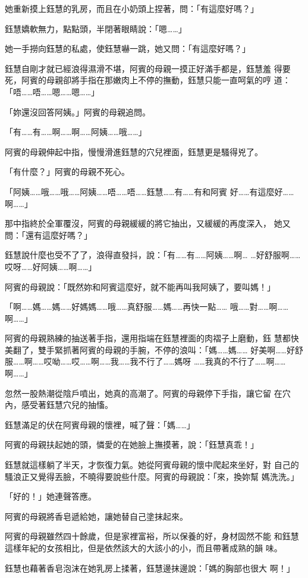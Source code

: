 她重新摸上鈺慧的乳房，而且在小奶頭上捏著，問：「有這麼好嗎？」

鈺慧嬌軟無力，點點頭，半閉著眼睛說：「嗯……」

她一手撈向鈺慧的私處，使鈺慧嚇一跳，她又問：「有這麼好嗎？」

鈺慧自剛才就已經浪得濕滑不堪，阿賓的母親一摸正好滿手都是，鈺慧羞
得要死，阿賓的母親卻將手指在那嫩肉上不停的撫動，鈺慧只能一直呵氣的哼
道：「唔……唔……嗯……嗯……」

「妳還沒回答阿姨。」阿賓的母親追問。

「有……有……啊……啊……阿姨……哦……」

阿賓的母親伸起中指，慢慢滑進鈺慧的穴兒裡面，鈺慧更是騷得兇了。

「有什麼？」阿賓的母親不死心。

「阿姨……哦……哦……阿姨……唔……唔……鈺慧……有……有和阿賓
好……有這麼好……啊……」

那中指終於全軍覆沒，阿賓的母親緩緩的將它抽出，又緩緩的再度深入，
她又問：「還有這麼好嗎？」

鈺慧說什麼也受不了了，浪得直發抖，說：「有……有……阿姨……啊…
…好舒服啊……哎呀……好阿姨……啊……」

阿賓的母親說：「既然妳和阿賓這麼好，就不能再叫我阿姨了，要叫媽！」

「啊……媽……媽……好媽媽……哦……真舒服……媽……再快一點……
哦……對……啊……啊……」

阿賓的母親熟練的抽送著手指，還用指端在鈺慧裡面的肉褶子上磨動，鈺
慧都快美翻了，雙手緊抓著阿賓的母親的手腕，不停的浪叫：「媽……媽……
好美啊……好舒服……啊……哎呦……哎……啊……我……我不行了……媽呀
……我真的不行了……啊……啊……」

忽然一股熱潮從陰戶噴出，她真的高潮了。阿賓的母親停下手指，讓它留
在穴內，感受著鈺慧穴兒的抽慉。

鈺慧滿足的伏在阿賓母親的懷裡，喊了聲：「媽……」

阿賓的母親扶起她的頭，憐愛的在她臉上撫摸著，說：「鈺慧真乖！」

鈺慧就這樣躺了半天，才恢復力氣。她從阿賓母親的懷中爬起來坐好，對
自己的騷浪正又覺得丟臉，不曉得要說些什麼。阿賓的母親說：「來，換妳幫
媽洗洗。」

「好的！」她連聲答應。

阿賓的母親將香皂遞給她，讓她替自己塗抹起來。

阿賓的母親雖然四十餘歲，但是家裡富裕，所以保養的好，身材固然不能
和鈺慧這樣年紀的女孩相比，但是依然該大的大該小的小，而且帶著成熟的韻
味。

鈺慧也藉著香皂泡沫在她乳房上揉著，鈺慧邊抹邊說：「媽的胸部也很大
啊！」

